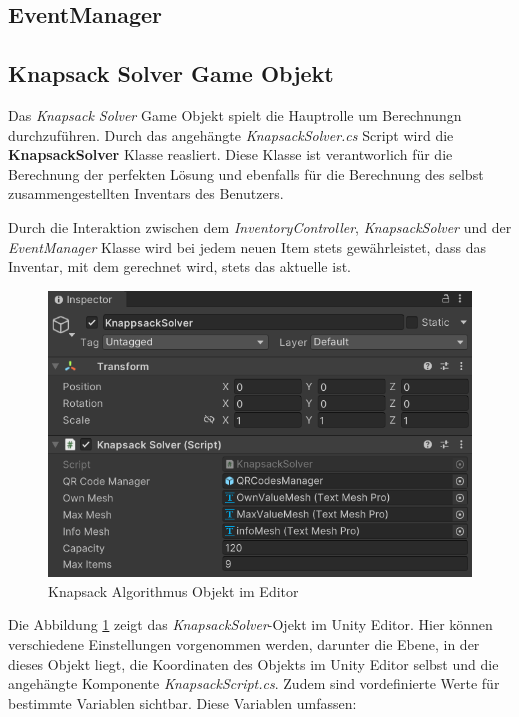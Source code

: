 \subsection{EventManager}

\subsection{Knapsack Solver Game Objekt}
Das \textit{Knapsack Solver} Game Objekt spielt die Hauptrolle um Berechnungn durchzuführen.
Durch das angehängte \textit{KnapsackSolver.cs} Script wird die \textbf{KnapsackSolver} Klasse reasliert. Diese
Klasse ist verantworlich für die Berechnung der perfekten Lösung und ebenfalls für die Berechnung des selbst
zusammengestellten Inventars des Benutzers.

Durch die Interaktion zwischen dem \textit{InventoryController}, \textit{KnapsackSolver} und der
\textit{EventManager} Klasse wird bei jedem neuen Item stets gewährleistet, dass das Inventar, mit dem gerechnet wird, stets das aktuelle ist.\\

\begin{figure}[H]
\centering
\includegraphics[scale=0.8]{images/knapsackEditor}
\caption{Knapsack Algorithmus Objekt im Editor}
\label{fig:Knapsack_Editor}
\end{figure}

Die Abbildung \ref{fig:Knapsack_Editor} zeigt das \textit{KnapsackSolver}-Ojekt im Unity Editor. Hier können verschiedene
Einstellungen vorgenommen werden, darunter die Ebene, in der dieses Objekt liegt, die Koordinaten des Objekts im
Unity Editor selbst und die angehängte Komponente \textit{KnapsackScript.cs}. Zudem sind vordefinierte Werte für
bestimmte Variablen sichtbar. Diese Variablen umfassen:

